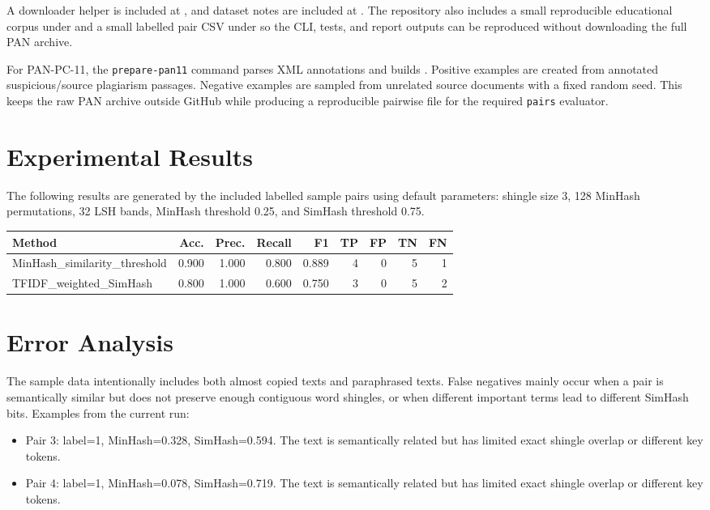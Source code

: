 \documentclass[11pt,a4paper]{article}
\begin{document}
A downloader helper is included at , and dataset notes are included at . The repository also includes a small reproducible educational corpus under  and a small labelled pair CSV under  so the CLI, tests, and report outputs can be reproduced without downloading the full PAN archive.

For PAN-PC-11, the \texttt{prepare-pan11} command parses XML annotations and builds . Positive examples are created from annotated suspicious/source plagiarism passages. Negative examples are sampled from unrelated source documents with a fixed random seed. This keeps the raw PAN archive outside GitHub while producing a reproducible pairwise file for the required \texttt{pairs} evaluator.

\section{Experimental Results}
The following results are generated by the included labelled sample pairs using default parameters: shingle size 3, 128 MinHash permutations, 32 LSH bands, MinHash threshold 0.25, and SimHash threshold 0.75.

\begin{center}
\begin{tabular}{lrrrrrrrr}
\toprule
Method & Acc. & Prec. & Recall & F1 & TP & FP & TN & FN \\
\midrule
MinHash\_similarity\_threshold & 0.900 & 1.000 & 0.800 & 0.889 & 4 & 0 & 5 & 1 \\
TFIDF\_weighted\_SimHash & 0.800 & 1.000 & 0.600 & 0.750 & 3 & 0 & 5 & 2 \\
\bottomrule
\end{tabular}
\end{center}

\section{Error Analysis}
The sample data intentionally includes both almost copied texts and paraphrased texts. False negatives mainly occur when a pair is semantically similar but does not preserve enough contiguous word shingles, or when different important terms lead to different SimHash bits. Examples from the current run:
\begin{itemize}

  \item Pair 3: label=1, MinHash=0.328, SimHash=0.594. The text is semantically related but has limited exact shingle overlap or different key tokens.
  \item Pair 4: label=1, MinHash=0.078, SimHash=0.719. The text is semantically related but has limited exact shingle overlap or different key tokens.
\end{itemize}
\end{document}
